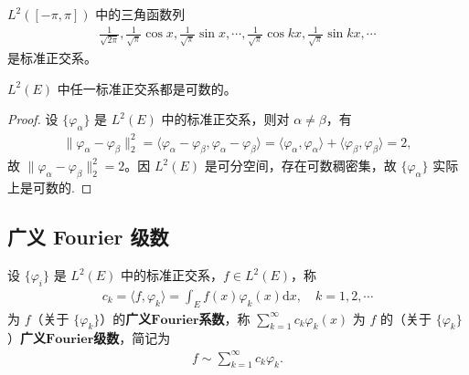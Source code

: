 \documentclass[../../main.tex]{subfiles}%
\begin{document}
\begin{example}
$L^2([-\pi, \pi])$ 中的三角函数列
\begin{align*}
\frac{1}{\sqrt{2\pi}}, \frac{1}{\sqrt{\pi}}\cos x, \frac{1}{\sqrt{\pi}}\sin x, \cdots, \frac{1}{\sqrt{\pi}}\cos kx, \frac{1}{\sqrt{\pi}}\sin kx, \cdots
\end{align*}
是标准正交系。
\end{example}

\begin{theorem}
$L^2(E)$ 中任一标准正交系都是可数的。
\end{theorem}
\begin{proof}
设 $\{\varphi_\alpha\}$ 是 $L^2(E)$ 中的标准正交系，则对 $\alpha \neq \beta$，有
\begin{align*}
\|\varphi_\alpha - \varphi_\beta\|_2^2 = \langle \varphi_\alpha - \varphi_\beta, \varphi_\alpha - \varphi_\beta \rangle = \langle \varphi_\alpha, \varphi_\alpha \rangle + \langle \varphi_\beta, \varphi_\beta \rangle = 2,
\end{align*}
故 $\|\varphi_\alpha - \varphi_\beta\|_2^2 = 2$。因 $L^2(E)$ 是可分空间，存在可数稠密集，故 $\{\varphi_\alpha\}$ 实际上是可数的.
\end{proof}


\subsection{广义 Fourier 级数}

\begin{definition}
设 $\{\varphi_i\}$ 是 $L^2(E)$ 中的标准正交系，$f \in L^2(E)$，称
\begin{align*}
c_k = \langle f, \varphi_k \rangle = \int_E f(x) \varphi_k(x) \mathrm{d}x, \quad k=1,2,\cdots
\end{align*}
为 $f$（关于 $\{\varphi_k\}$）的\textbf{广义}$\mathbf{Fourier}$\textbf{系数}，称 $\sum\limits_{k=1}^\infty c_k \varphi_k(x)$ 为 $f$ 的（关于 $\{\varphi_k\}$）\textbf{广义}$\mathbf{Fourier}$\textbf{级数}，简记为
\begin{align*}
f \sim \sum\limits_{k=1}^\infty c_k \varphi_k.
\end{align*}
\end{definition}
\end{document}
